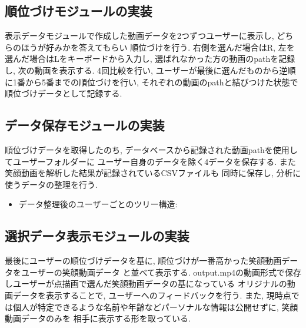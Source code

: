 \subsection{順位づけモジュールの実装}
表示データモジュールで作成した動画データを2つずつユーザーに表示し, どちらのほうが好みかを答えてもらい
順位づけを行う. 右側を選んだ場合はR, 左を選んだ場合はLをキーボードから入力し,
選ばれなかった方の動画のpathを記録し, 次の動画を表示する.
4回比較を行い, ユーザーが最後に選んだものから逆順に1番から5番までの順位づけを行い,
それぞれの動画のpathと結びつけた状態で順位づけデータとして記録する.

\subsection{データ保存モジュールの実装}
順位づけデータを取得したのち, データベースから記録された動画pathを使用してユーザーフォルダーに
ユーザー自身のデータを除く4データを保存する. また笑顔動画を解析した結果が記録されているCSVファイルも
同時に保存し, 分析に使うデータの整理を行う.

\begin{itemize}
\item データ整理後のユーザーごとのツリー構造:
\end{itemize}

\subsection{選択データ表示モジュールの実装}
最後にユーザーの順位づけデータを基に, 順位づけが一番高かった笑顔動画データをユーザーの笑顔動画データ
と並べて表示する. output.mp4の動画形式で保存しユーザーが点描画で選んだ笑顔動画データの基になっている
オリジナルの動画データを表示することで, ユーザーへのフィードバックを行う.
また, 現時点では個人が特定できるような名前や年齢などパーソナルな情報は公開せずに, 笑顔動画データのみを
相手に表示する形を取っている.

